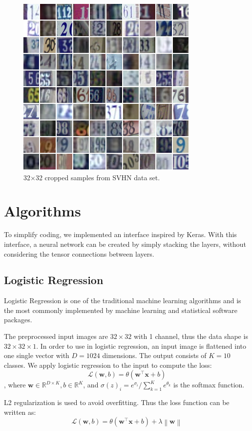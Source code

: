 \documentclass[journal]{IEEEtran}
\newcommand{\norm}[1]{\left\lVert#1\right\rVert}
\begin{document}
\begin{figure}[!t]
    \centering
    \includegraphics[width=.45\textwidth]{images/32x32eg.png}
    \caption{32$\times$32 cropped samples from SVHN data set.}
    \label{fig:svhn_sample}
\end{figure}


\section{Algorithms}

To simplify coding, we implemented an interface inspired by Keras. With this interface, a neural network can be created by simply stacking the layers, without considering the tensor connections between layers.

\subsection{Logistic Regression}

Logistic Regression is one of the traditional machine learning algorithms and is the most commonly implemented by machine learning and statistical software packages. 

The preprocessed input images are $32 \times 32$ with 1 channel, thus the data shape is $32 \times 32 \times 1$. In order to use in logistic regression, an input image is flattened into one single vector with $D = 1024$ dimensions. The output consists of $K = 10$ classes. We apply logistic regression to the input to compute the loss:
$$\mathcal{L}(\mathbf{w}, b) = \theta(\mathbf{w}^\intercal \mathbf{x} + b)$$,
where $\mathbf{w} \in \mathbb{R}^{D \times K}, b \in \mathbb{R}^{K}$, and $\sigma(z)_i = e^{\sigma_i} / \sum_{k=1}^K e^{\theta_k}$ is the softmax function.

L2 regularization is used to avoid overfitting. Thus the loss function can be written as:
$$\mathcal{L}(\mathbf{w}, b) = \theta(\mathbf{w}^\intercal \mathbf{x} + b) + \lambda \norm{\textbf{w}}$$
\end{document}
